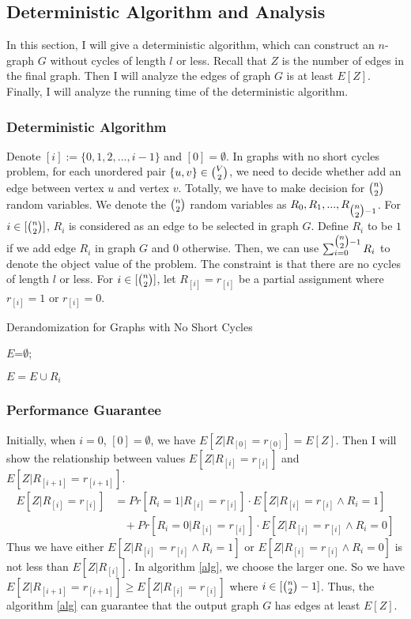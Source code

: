 \subsection{Deterministic Algorithm and Analysis}
In this section, I will give a deterministic algorithm, which can construct an $n$-graph $G$ without cycles of length $l$ or less. 
Recall that $Z$ is the number of edges in the final graph.
Then I will analyze the edges of graph $G$ is at least $E[Z]$. 
Finally, I will analyze the running time of the deterministic algorithm.
\subsubsection{Deterministic Algorithm}
Denote $[i]:=\{0,1,2,...,i-1\}$ and $[0]=\emptyset$.
In graphs with no short cycles problem, for each unordered pair $\{u, v\} \in \tbinom{V}{2}$, we need to decide whether add an edge between vertex $u$ and vertex $v$. 
Totally, we have to make decision for $\tbinom{n}{2}$ random variables.
We denote the $\tbinom{n}{2}$ random variables as $R_0, R_1, ..., R_{\tbinom{n}{2}-1}$. %
For $i\in [\tbinom{n}{2}]$, $R_i$ is considered as an edge to be selected in graph $G$.
Define $R_i$ to be $1$ if we add edge $R_i$ in graph $G$ and $0$ otherwise. 
Then, we can use $\sum_{i=0}^{\tbinom{n}{2}-1}R_i$ to denote the object value of the problem. The constraint is that there are no cycles of length $l$ or less.
For $i\in [\tbinom{n}{2}]$, let $R_{[i]}=r_{[i]}$ be a partial assignment where $r_{[i]}=1$ or $r_{[i]}=0$.
\begin{algorithm}
    \caption{Derandomization for Graphs with No Short Cycles}\label{alg}
    {
        $E$=$\emptyset$;

        {
            {
               $ E=E\cup R_i$
            }
        
        }
    }
\end{algorithm}
\subsubsection{Performance Guarantee}

Initially, when $i=0$, $[0]=\emptyset$, we have $E[Z|R_{[0]}=r_{[0]}]=E[Z]$.
Then I will show the relationship between values $E[Z|R_{[i]}=r_{[i]}]$ and  $E[Z|R_{[i+1]}=r_{[i+1]}]$. 
\begin{align}
    \nonumber E[Z|R_{[i]}=r_{[i]}]&=Pr[R_i=1|R_{[i]}=r_{[i]}]\cdot E[Z|R_{[i]}=r_{[i]}\wedge R_i=1]\\
    \nonumber &~~~~+Pr[R_i=0|R_{[i]}=r_{[i]}]\cdot E[Z|R_{[i]}=r_{[i]}\wedge R_i=0]
\end{align}
Thus we have either $E[Z|R_{[i]}=r_{[i]}\wedge R_i=1]$ or $E[Z|R_{[i]}=r_{[i]}\wedge R_i=0]$ is not less than  $E[Z|R_{[i]}] $. In algorithm \ref{alg}, we choose the larger one. So we have $E[Z|R_{[i+1]}=r_{[i+1]}] \ge E[Z|R_{[i]}=r_{[i]}]$ where $i\in [\tbinom{n}{2}-1]$.
Thus, the algorithm \ref{alg} can guarantee that the output graph $G$ has edges at least $E[Z]$.
